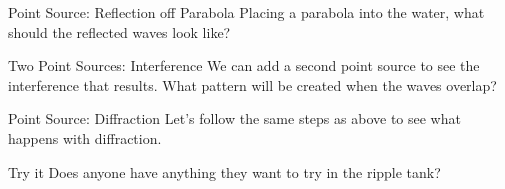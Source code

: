 \documentclass{beamer}
\begin{document}
\begin{frame}{Point Source: Reflection off Parabola}
    Placing a parabola into the water, what should the reflected waves look like? \vspace{5mm}
    
\end{frame}

\begin{frame}{Two Point Sources: Interference}
    We can add a second point source to see the interference that results. What pattern will be created when the waves overlap?
\end{frame}

\begin{frame}{Point Source: Diffraction}
    Let's follow the same steps as above to see what happens with diffraction.
\end{frame}

\begin{frame}{Try it}
    Does anyone have anything they want to try in the ripple tank?
\end{frame}
\end{document}

